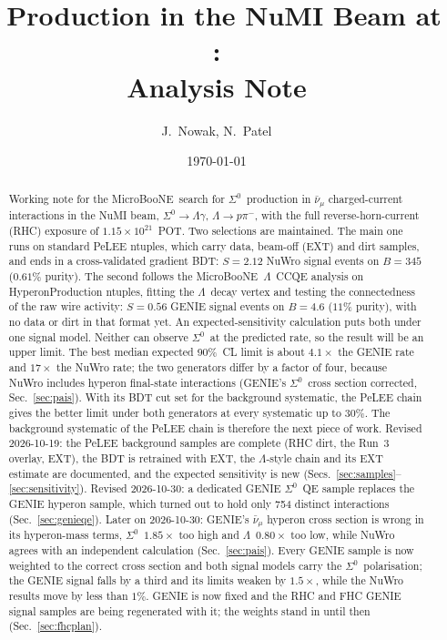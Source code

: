 \documentclass[11pt,a4paper]{article}
\title{\Szero\ Production in the NuMI Beam at \uboone:\\ Analysis Note}
\author{J.~Nowak, N.~Patel}
\date{\today}
\newcommand{\Szero}{\ensuremath{\Sigma^{0}}}
\newcommand{\Lam}{\ensuremath{\Lambda}}
\newcommand{\uboone}{MicroBooNE}
\newcommand{\numubar}{\ensuremath{\bar{\nu}_\mu}}
\begin{document}
\maketitle

\begin{abstract}
Working note for the \uboone\ search for \Szero\ production in $\numubar$
charged-current interactions in the NuMI beam, $\Szero\to\Lam\gamma$,
$\Lam\to p\pi^-$, with the full reverse-horn-current (RHC) exposure of
$1.15\times10^{21}$~POT. Two selections are maintained. The main one runs on
standard PeLEE ntuples, which carry data, beam-off (EXT) and dirt samples, and ends
in a cross-validated gradient BDT: $S=2.12$ NuWro signal events on $B=345$
($0.61\%$ purity). The second follows the \uboone\ \Lam\ CCQE analysis on
HyperonProduction ntuples, fitting the \Lam\ decay vertex and testing the
connectedness of the raw wire activity: $S=0.56$ GENIE signal events on $B=4.6$
($11\%$ purity), with no data or dirt in that format yet. An expected-sensitivity
calculation puts both under one signal model. Neither can observe \Szero\ at the
predicted rate, so the result will be an upper limit. The best median expected
90\%~CL limit is about $4.1\times$ the GENIE rate and $17\times$ the NuWro rate; the two
generators differ by a factor of four, because NuWro includes hyperon final-state
interactions (GENIE's \Szero\ cross section corrected, Sec.~\ref{sec:pais}). With its BDT cut set for the background systematic, the PeLEE chain
gives the better limit under both generators at every systematic up to $30\%$.
The background systematic of the PeLEE chain is therefore the next piece of work.
Revised 2026-10-19: the PeLEE background samples are complete (RHC dirt, the Run~3
overlay, EXT), the BDT is retrained with EXT, the \Lam-style chain and its EXT
estimate are documented, and the expected sensitivity is new
(Secs.~\ref{sec:samples}--\ref{sec:sensitivity}).
Revised 2026-10-30: a dedicated GENIE \Szero\ QE sample replaces the GENIE hyperon
sample, which turned out to hold only 754 distinct interactions
(Sec.~\ref{sec:genieqe}).
Later on 2026-10-30: GENIE's $\numubar$ hyperon cross section is wrong in its
hyperon-mass terms, \Szero\ $1.85\times$ too high and \Lam\ $0.80\times$ too low,
while NuWro agrees with an independent calculation (Sec.~\ref{sec:pais}). Every GENIE
sample is now weighted to the correct cross section and both signal models carry the
\Szero\ polarisation; the GENIE signal falls by a third and its limits weaken by
$1.5\times$, while the NuWro results move by less than $1\%$. GENIE is now fixed and the
RHC and FHC GENIE signal samples are being regenerated with it; the weights stand in until
then (Sec.~\ref{sec:fhcplan}).
\end{abstract}
\end{document}
